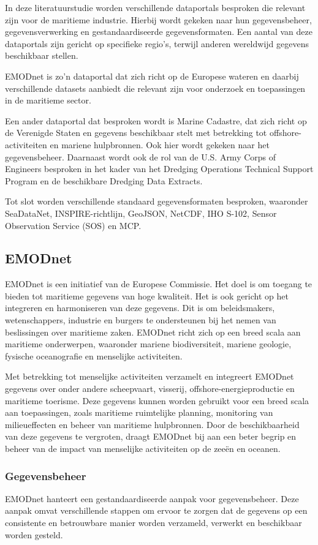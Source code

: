 In deze literatuurstudie worden verschillende dataportals besproken die relevant zijn voor de maritieme industrie. Hierbij wordt gekeken naar hun gegevensbeheer, gegevensverwerking en gestandaardiseerde gegevensformaten. Een aantal van deze dataportals zijn gericht op specifieke regio's, terwijl anderen wereldwijd gegevens beschikbaar stellen.

EMODnet is zo'n dataportal dat zich richt op de Europese wateren en daarbij verschillende datasets aanbiedt die relevant zijn voor onderzoek en toepassingen in de maritieme sector.

Een ander dataportal dat besproken wordt is Marine Cadastre, dat zich richt op de Verenigde Staten en gegevens beschikbaar stelt met betrekking tot offshore-activiteiten en mariene hulpbronnen. Ook hier wordt gekeken naar het gegevensbeheer.
Daarnaast wordt ook de rol van de U.S. Army Corps of Engineers besproken in het kader van het Dredging Operations Technical Support Program en de beschikbare Dredging Data Extracts. 

Tot slot worden verschillende standaard gegevensformaten besproken, waaronder SeaDataNet, INSPIRE-richtlijn, GeoJSON, NetCDF, IHO S-102, Sensor Observation Service (SOS) en MCP.

\subsection{EMODnet}
EMODnet is een initiatief van de Europese Commissie. Het doel is om toegang te bieden tot maritieme gegevens van hoge kwaliteit. Het is ook gericht op het integreren en harmoniseren van deze gegevens. Dit is om beleidsmakers, wetenschappers, industrie en burgers te ondersteunen bij het nemen van beslissingen over maritieme zaken. EMODnet richt zich op een breed scala aan maritieme onderwerpen, waaronder mariene biodiversiteit, mariene geologie, fysische oceanografie en menselijke activiteiten.

Met betrekking tot menselijke activiteiten verzamelt en integreert EMODnet gegevens over onder andere scheepvaart, visserij, offshore-energieproductie en maritieme toerisme. Deze gegevens kunnen worden gebruikt voor een breed scala aan toepassingen, zoals maritieme ruimtelijke planning, monitoring van milieueffecten en beheer van maritieme hulpbronnen. Door de beschikbaarheid van deze gegevens te vergroten, draagt EMODnet bij aan een beter begrip en beheer van de impact van menselijke activiteiten op de zeeën en oceanen.

\subsubsection{Gegevensbeheer}
EMODnet hanteert een gestandaardiseerde aanpak voor gegevensbeheer. Deze aanpak omvat verschillende stappen om ervoor te zorgen dat de gegevens op een consistente en betrouwbare manier worden verzameld, verwerkt en beschikbaar worden gesteld.

